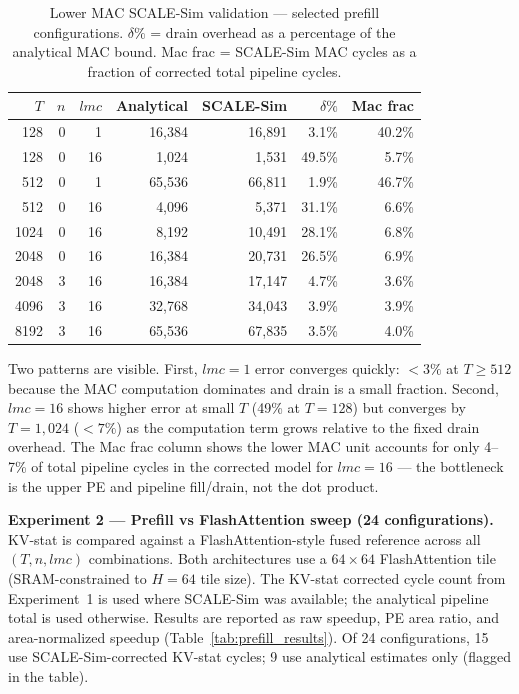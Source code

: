 \documentclass[11pt]{article}
\begin{document}
\begin{table}[H]
\centering
\caption{Lower MAC SCALE-Sim validation --- selected prefill configurations.
\(\delta\%\) = drain overhead as a percentage of the analytical MAC bound.
Mac frac = SCALE-Sim MAC cycles as a fraction of corrected total pipeline cycles.}
\label{tab:mac_validation}
\begin{tabular}{rrrrrrr}
\toprule
\(T\) & \(n\) & \(lmc\) & Analytical & SCALE-Sim & \(\delta\%\) & Mac frac \\
\midrule
128  & 0 &  1 & 16,384 & 16,891 & 3.1\%  & 40.2\% \\
128  & 0 & 16 &  1,024 &  1,531 & 49.5\% &  5.7\% \\
512  & 0 &  1 & 65,536 & 66,811 & 1.9\%  & 46.7\% \\
512  & 0 & 16 &  4,096 &  5,371 & 31.1\% &  6.6\% \\
1024 & 0 & 16 &  8,192 & 10,491 & 28.1\% &  6.8\% \\
2048 & 0 & 16 & 16,384 & 20,731 & 26.5\% &  6.9\% \\
2048 & 3 & 16 & 16,384 & 17,147 &  4.7\% &  3.6\% \\
4096 & 3 & 16 & 32,768 & 34,043 &  3.9\% &  3.9\% \\
8192 & 3 & 16 & 65,536 & 67,835 &  3.5\% &  4.0\% \\
\bottomrule
\end{tabular}
\end{table}

Two patterns are visible.
First, \(lmc = 1\) error converges quickly: \(<3\%\) at \(T \geq 512\)
because the MAC computation dominates and drain is a small fraction.
Second, \(lmc = 16\) shows higher error at small \(T\) (49\% at
\(T=128\)) but converges by \(T = 1{,}024\) (\(<7\%\)) as the
computation term grows relative to the fixed drain overhead.
The Mac frac column shows the lower MAC unit accounts for only
4--7\% of total pipeline cycles in the corrected model for
\(lmc = 16\) --- the bottleneck is the upper PE and pipeline
fill/drain, not the dot product.

\textbf{Experiment 2 --- Prefill vs FlashAttention sweep (24 configurations).}
KV-stat is compared against a FlashAttention-style fused reference
across all \((T, n, lmc)\) combinations.
Both architectures use a \(64 \times 64\) FlashAttention tile
(SRAM-constrained to \(H = 64\) tile size).
The KV-stat corrected cycle count from Experiment~1 is used where
SCALE-Sim was available; the analytical pipeline total is used
otherwise.
Results are reported as raw speedup, PE area ratio, and
area-normalized speedup (Table~\ref{tab:prefill_results}).
Of 24 configurations, 15 use SCALE-Sim-corrected KV-stat cycles;
9 use analytical estimates only (flagged in the table).
\end{document}
